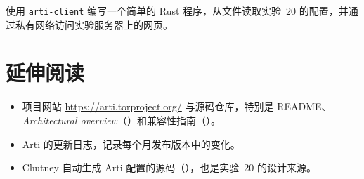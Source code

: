 \begin{esercizio}[3]\label{es:30-libreria}
使用 \texttt{arti-client} 编写一个简单的 Rust 程序，从文件读取实验~20 的配置，并通过私有网络访问实验服务器上的网页。
\end{esercizio}

\section*{延伸阅读}
\begin{itemize}
  \item 项目网站 \url{https://arti.torproject.org/} 与源码仓库，特别是 README、\emph{Architectural overview}（）和兼容性指南（）。
  \item Arti 的更新日志，记录每个月发布版本中的变化。
  \item Chutney 自动生成 Arti 配置的源码（），也是实验~20 的设计来源。
\end{itemize}
